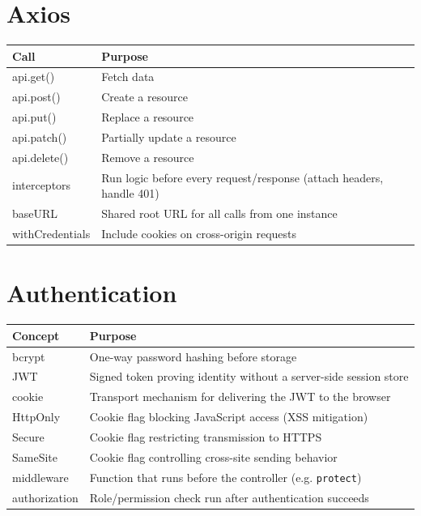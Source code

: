 \section{Axios}

\begin{tabularx}{\textwidth}{@{}>{\ttfamily}p{4cm}X@{}}
\toprule
Call & Purpose \\
\midrule
api.get() & Fetch data \\
api.post() & Create a resource \\
api.put() & Replace a resource \\
api.patch() & Partially update a resource \\
api.delete() & Remove a resource \\
interceptors & Run logic before every request/response (attach headers, handle 401) \\
baseURL & Shared root URL for all calls from one instance \\
withCredentials & Include cookies on cross-origin requests \\
\bottomrule
\end{tabularx}

\section{Authentication}

\begin{tabularx}{\textwidth}{@{}>{\ttfamily}p{4cm}X@{}}
\toprule
Concept & Purpose \\
\midrule
bcrypt & One-way password hashing before storage \\
JWT & Signed token proving identity without a server-side session store \\
cookie & Transport mechanism for delivering the JWT to the browser \\
HttpOnly & Cookie flag blocking JavaScript access (XSS mitigation) \\
Secure & Cookie flag restricting transmission to HTTPS \\
SameSite & Cookie flag controlling cross-site sending behavior \\
middleware & Function that runs before the controller (e.g. \texttt{protect}) \\
authorization & Role/permission check run after authentication succeeds \\
\bottomrule
\end{tabularx}
